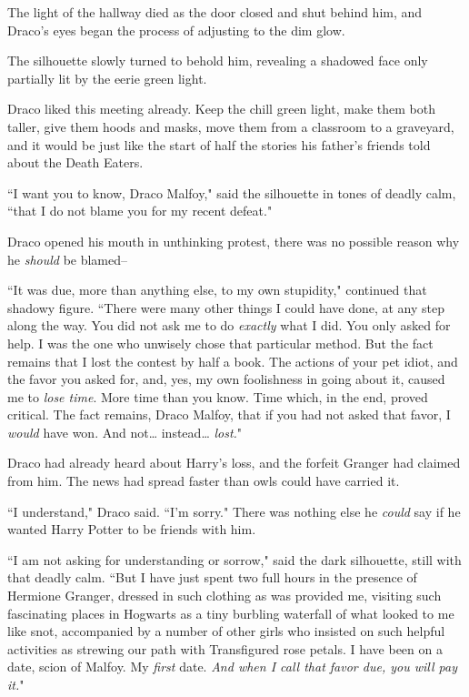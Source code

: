 The light of the hallway died as the door closed and shut behind him, and Draco's eyes began the process of adjusting to the dim glow.

The silhouette slowly turned to behold him, revealing a shadowed face only partially lit by the eerie green light.

Draco liked this meeting already. Keep the chill green light, make them both taller, give them hoods and masks, move them from a classroom to a graveyard, and it would be just like the start of half the stories his father's friends told about the Death Eaters.

``I want you to know, Draco Malfoy," said the silhouette in tones of deadly calm, ``that I do not blame you for my recent defeat."

Draco opened his mouth in unthinking protest, there was no possible reason why he \emph{should} be blamed\---

``It was due, more than anything else, to my own stupidity," continued that shadowy figure. ``There were many other things I could have done, at any step along the way. You did not ask me to do \emph{exactly} what I did. You only asked for help. I was the one who unwisely chose that particular method. But the fact remains that I lost the contest by half a book. The actions of your pet idiot, and the favor you asked for, and, yes, my own foolishness in going about it, caused me to \emph{lose time}. More time than you know. Time which, in the end, proved critical. The fact remains, Draco Malfoy, that if you had not asked that favor, I \emph{would} have won. And not{\ldots} instead{\ldots} \emph{lost.}"

Draco had already heard about Harry's loss, and the forfeit Granger had claimed from him. The news had spread faster than owls could have carried it.

``I understand," Draco said. ``I'm sorry." There was nothing else he \emph{could} say if he wanted Harry Potter to be friends with him.

``I am not asking for understanding or sorrow," said the dark silhouette, still with that deadly calm. ``But I have just spent two full hours in the presence of Hermione Granger, dressed in such clothing as was provided me, visiting such fascinating places in Hogwarts as a tiny burbling waterfall of what looked to me like snot, accompanied by a number of other girls who insisted on such helpful activities as strewing our path with Transfigured rose petals. I have been on a date, scion of Malfoy. My \emph{first} date. \emph{And when I call that favor due, you will pay it.}"

